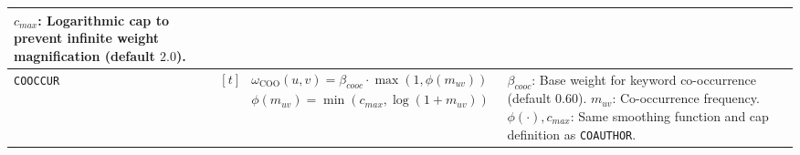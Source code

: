 \begin{table}[!t]
\begin{tabular}{@{} l| p{6cm} p{7cm} @{}}
$c_{max}$: Logarithmic cap to prevent infinite weight magnification (default $2.0$). \\
\midrule
\texttt{COOCCUR} & 
$\begin{aligned}[t]
&\omega_{\text{COO}}(u,v) = \beta_{cooc} \cdot \max(1, \phi(m_{uv})) \\
&\phi(m_{uv}) = \min(c_{max}, \log(1+m_{uv}))
\end{aligned}$ & 
$\beta_{cooc}$: Base weight for keyword co-occurrence (default $0.60$). \newline
$m_{uv}$: Co-occurrence frequency. \newline
$\phi(\cdot), c_{max}$: Same smoothing function and cap definition as \texttt{COAUTHOR}. \\
\bottomrule
\end{tabular}
\label{tab:edge_weight}
\end{table}